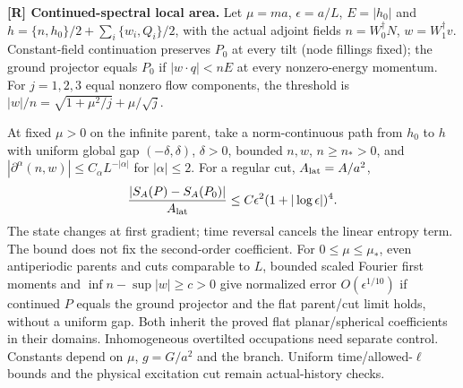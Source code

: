 \noindent\textbf{[R] Continued-spectral local area.}
Let $\mu=ma$, $\epsilon=a/L$, $E=|h_0|$ and
$h=\{n,h_0\}/2+\sum_i\{w_i,Q_i\}/2$, with the actual adjoint fields
$n=W_0^\dagger N$, $w=W_1^\dagger v$.
Constant-field continuation preserves $P_0$ at every tilt (node fillings
fixed); the ground projector equals $P_0$ if $|w\cdot q|<nE$ at every
nonzero-energy momentum. For $j=1,2,3$ equal nonzero flow components,
the threshold is $|w|/n=\sqrt{1+\mu^2/j}+\mu/\sqrt j$.

At fixed $\mu>0$ on the infinite parent, take a norm-continuous path from
$h_0$ to $h$ with uniform global gap $(-\delta,\delta)$, $\delta>0$,
bounded $n,w$, $n\ge n_*>0$, and
$|\partial^\alpha(n,w)|\le C_\alpha L^{-|\alpha|}$ for $|\alpha|\le2$.
For a regular cut, $A_{\rm lat}=A/a^2$,
\begingroup
\setlength{\abovedisplayskip}{4pt}
\setlength{\belowdisplayskip}{4pt}
\[
 \frac{|S_A(P)-S_A(P_0)|}{A_{\rm lat}}
 \le C\epsilon^2(1+|\log\epsilon|)^4 .
\]
\endgroup
\vspace{-1pt}
The state changes at first gradient; time reversal cancels the linear
entropy term. The bound does not fix the second-order coefficient.
For $0\le\mu\le\mu_*$, even antiperiodic parents and cuts comparable to $L$,
bounded scaled Fourier first moments and $\inf n-\sup|w|\ge c>0$ give
normalized error $O(\epsilon^{1/10})$ if continued $P$ equals the ground
projector and the flat parent/cut limit holds, without a uniform gap.
Both inherit the proved flat planar/spherical coefficients in their domains.
Inhomogeneous overtilted occupations need separate control.
Constants depend on $\mu$, $g=G/a^2$ and the branch.
Uniform time/allowed-$\ell$ bounds and the physical excitation cut
remain actual-history checks.

